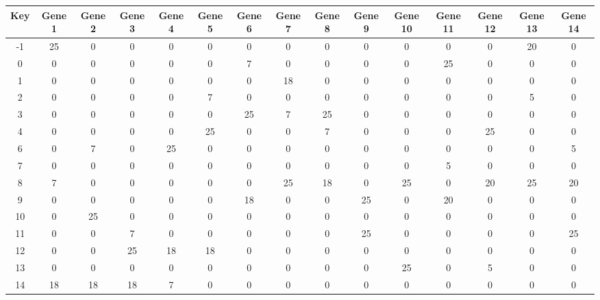 \begin{tabular}{|c|c|c|c|c|c|c|c|c|c|c|c|c|c|c|}
\hline
Key & Gene 1 & Gene 2 & Gene 3 & Gene 4 & Gene 5 & Gene 6 & Gene 7 & Gene 8 & Gene 9 & Gene 10 & Gene 11 & Gene 12 & Gene 13 & Gene 14 \\
\hline
-1 & 25 & 0 & 0 & 0 & 0 & 0 & 0 & 0 & 0 & 0 & 0 & 0 & 20 & 0 \\
0 & 0 & 0 & 0 & 0 & 0 & 7 & 0 & 0 & 0 & 0 & 25 & 0 & 0 & 0 \\
1 & 0 & 0 & 0 & 0 & 0 & 0 & 18 & 0 & 0 & 0 & 0 & 0 & 0 & 0 \\
2 & 0 & 0 & 0 & 0 & 7 & 0 & 0 & 0 & 0 & 0 & 0 & 0 & 5 & 0 \\
3 & 0 & 0 & 0 & 0 & 0 & 25 & 7 & 25 & 0 & 0 & 0 & 0 & 0 & 0 \\
4 & 0 & 0 & 0 & 0 & 25 & 0 & 0 & 7 & 0 & 0 & 0 & 25 & 0 & 0 \\
6 & 0 & 7 & 0 & 25 & 0 & 0 & 0 & 0 & 0 & 0 & 0 & 0 & 0 & 5 \\
7 & 0 & 0 & 0 & 0 & 0 & 0 & 0 & 0 & 0 & 0 & 5 & 0 & 0 & 0 \\
8 & 7 & 0 & 0 & 0 & 0 & 0 & 25 & 18 & 0 & 25 & 0 & 20 & 25 & 20 \\
9 & 0 & 0 & 0 & 0 & 0 & 18 & 0 & 0 & 25 & 0 & 20 & 0 & 0 & 0 \\
10 & 0 & 25 & 0 & 0 & 0 & 0 & 0 & 0 & 0 & 0 & 0 & 0 & 0 & 0 \\
11 & 0 & 0 & 7 & 0 & 0 & 0 & 0 & 0 & 25 & 0 & 0 & 0 & 0 & 25 \\
12 & 0 & 0 & 25 & 18 & 18 & 0 & 0 & 0 & 0 & 0 & 0 & 0 & 0 & 0 \\
13 & 0 & 0 & 0 & 0 & 0 & 0 & 0 & 0 & 0 & 25 & 0 & 5 & 0 & 0 \\
14 & 18 & 18 & 18 & 7 & 0 & 0 & 0 & 0 & 0 & 0 & 0 & 0 & 0 & 0 \\
\hline
\end{tabular}